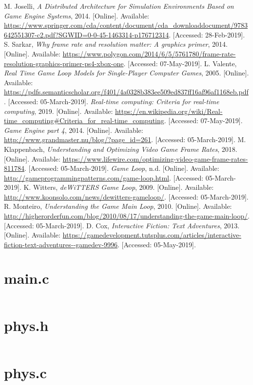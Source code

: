 \documentclass[a4paper, 12pt]{article}
\begin{document}
    \begin{thebibliography}{9}
            M. Joselli, \textit{A Distributed Architecture for Simulation Environments Based on Game Engine Systems}, 2014. [Online]. Available: \url{https://www.springer.com/cda/content/document/cda_downloaddocument/9783642551307-c2.pdf?SGWID=0-0-45-1463314-p176712314}. [Accessed: 28-Feb-2019].
            S. Sarkar, \textit{Why frame rate and resolution matter: A graphics primer}, 2014. [Online]. Available: \url{https://www.polygon.com/2014/6/5/5761780/frame-rate-resolution-graphics-primer-ps4-xbox-one}. [Accessed: 07-May-2019].
            L. Valente, \textit{Real Time Game Loop Models for Single-Player Computer Games}, 2005. [Online]. Available: \url{https://pdfs.semanticscholar.org/f401/4a0328b383ee509ed837ff16af96af1168eb.pdf}. [Accessed: 05-March-2019].
            \textit{Real-time computing: Criteria for real-time computing}, 2019. [Online]. Available: \url{https://en.wikipedia.org/wiki/Real-time_computing#Criteria_for_real-time_computing}. [Accessed: 07-May-2019].
            \textit{Game Engine part 4}, 2014. [Online]. Available: \url{http://www.grandmaster.nu/blog/?page_id=261}. [Accessed: 05-March-2019].
            M. Klappenbach, \textit{Understanding and Optimizing Video Game Frame Rates}, 2018. [Online]. Available: \url{https://www.lifewire.com/optimizing-video-game-frame-rates-811784}. [Accessed: 05-March-2019].
            \textit{Game Loop}, n.d. [Online]. Available: \url{http://gameprogrammingpatterns.com/game-loop.html}. [Accessed: 05-March-2019].
            K. Witters, \textit{deWiTTERS Game Loop}, 2009. [Online]. Available: \url{http://www.koonsolo.com/news/dewitters-gameloop/}. [Accessed: 05-March-2019].
            R. Monteiro, \textit{Understanding the Game Main Loop}, 2010. [Online]. Available: \url{http://higherorderfun.com/blog/2010/08/17/understanding-the-game-main-loop/}. [Accessed: 05-March-2019].
            D. Cox, \textit{Interactive Fiction: Text Adventures}, 2013. [Online]. Available: \url{https://gamedevelopment.tutsplus.com/articles/interactive-fiction-text-adventures--gamedev-9996}. [Accessed: 05-May-2019].
    \end{thebibliography}

\newpage

\begin{appendices}

\section{main.c}
    \inputminted{c}{../main.c}
    \newpage

\section{phys.h}
    \inputminted{c}{../src/phys.h}
    \newpage

\section{phys.c}
    \inputminted{c}{../src/phys.c}
    \newpage

\end{appendices}
\end{document}
